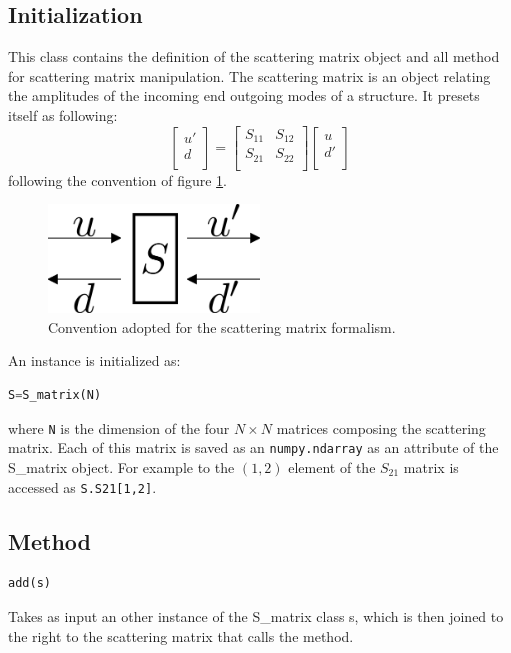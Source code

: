 \documentclass[a4paper,10pt]{report}
\begin{document}
\subsection{Initialization}
This class contains the definition of the scattering matrix object and all method for scattering matrix manipulation. The scattering matrix is an object relating the amplitudes of the incoming end outgoing modes of a structure. It presets itself as following:
\begin{equation} \label{eq:S_matrix_def}
\left[
\begin{array}{c}
u' \\
d  \\
\end{array} 
 \right] = \left[
 \begin{array}{cc}
S_{11} & S_{12} \\
S_{21} & S_{22} \\
\end{array}
 \right]
 \left[
\begin{array}{c}
u \\
d' \\
\end{array} 
\right]
\end{equation}
following the convention of figure \ref{fig:SM_conv}.
\begin{figure}
\centering
\includegraphics[width=0.5\textwidth]{figures/S.png}
\caption{Convention adopted for the scattering matrix formalism.} \label{fig:SM_conv}
\end{figure}
An instance is initialized as:
\begin{lstlisting}[language=Python]
S=S_matrix(N)
\end{lstlisting}
where \texttt{N} is the dimension of the four $N \times N$ matrices composing the scattering matrix. Each of this matrix is saved as an \texttt{numpy.ndarray} as an attribute of the S\_matrix object. For example to the $(1,2)$ element of the $S_{21}$ matrix is accessed as \texttt{S.S21[1,2]}.

\subsection{Method}
\begin{lstlisting}[language=Python,basicstyle=\ttfamily\Large]
add(s)
\end{lstlisting}
Takes as input an other instance of the S\_matrix class s, which is then joined to the right to the scattering matrix that calls the method.
\end{document}
